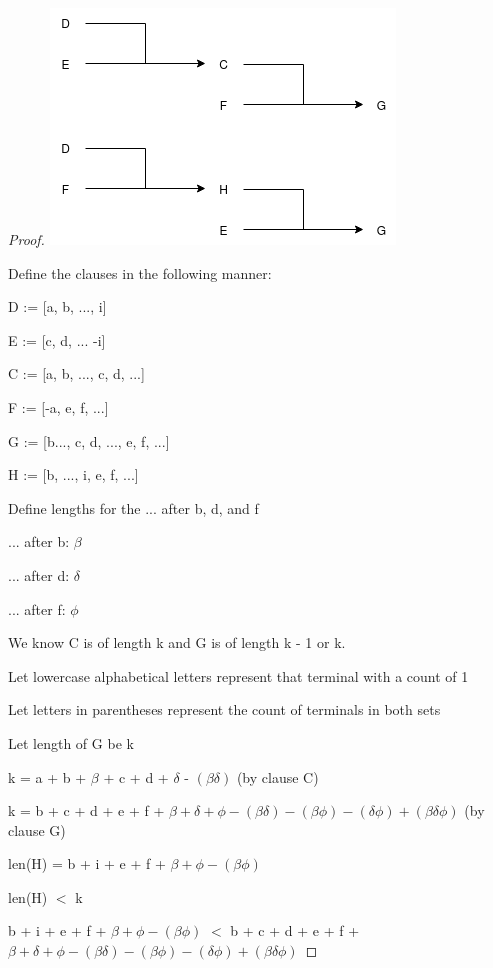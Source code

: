 \documentclass[manuscript]{acmart}
\begin{document}
\begin{proof}
        \includegraphics[scale=0.8]{317}

        Define the clauses in the following manner:

        D := [a, b, ..., i]

        E := [c, d, ... -i]

        C := [a, b, ..., c, d, ...]

        F := [-a, e, f, ...]

        G := [b..., c, d, ..., e, f, ...]

        H := [b, ..., i, e, f, ...]

        Define lengths for the ... after b, d, and f

        ... after b: $\beta$
        
        ... after d: $\delta$

        ... after f: $\phi$

        We know C is of length k and G is of length k - 1 or k.

        Let lowercase alphabetical letters represent that terminal with a count of 1

        Let letters in parentheses represent the count of terminals in both sets

        Let length of G be k

        k = a + b + $\beta$ + c + d + $\delta$ - $(\beta \delta)$ (by clause C)

        k = b + c + d + e + f + $\beta + \delta + \phi - (\beta \delta) - 
        (\beta \phi) - (\delta \phi) + (\beta \delta \phi)$ (by clause G)

        len(H) = b + i + e + f + $\beta + \phi - (\beta \phi)$

        len(H) $<$ k

        b + i + e + f + $\beta + \phi - (\beta \phi)$ $<$ 
        b + c + d + e + f + $\beta + \delta + \phi - (\beta \delta) - 
        (\beta \phi) - (\delta \phi) + (\beta \delta \phi)$


\end{proof}
\end{document}
